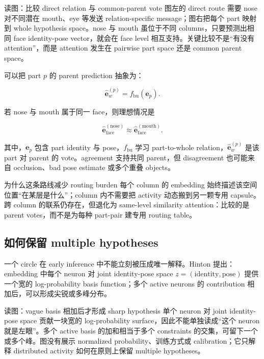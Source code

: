 \begin{knowledgebox}{读图：比较 direct relation 与 common-parent vote}
图左的 direct route 需要 nose 对不同潜在 mouth、eye 等发送 relation-specific message；图右把每个 part 映射到 whole hypothesis space。nose 与 mouth 虽位于不同 columns，只要预测出相同 face identity-pose vector，就会在 face level 相互支持。关键比较不是“有没有 attention”，而是 attention 发生在 pairwise part space 还是 common parent space。
\end{knowledgebox}

可以把 part $p$ 的 parent prediction 抽象为：

\[
\hat{\mathbf e}_{w}^{(p)}=f_{\mathrm{bu}}\!\left(\mathbf e_p\right).
\]

若 nose 与 mouth 属于同一 face，则理想情况是

\[
\hat{\mathbf e}_{\mathrm{face}}^{(\mathrm{nose})}
\approx
\hat{\mathbf e}_{\mathrm{face}}^{(\mathrm{mouth})}.
\]

其中，$\mathbf e_p$ 包含 part identity 与 pose，$f_{\mathrm{bu}}$ 学习 part-to-whole relation，$\hat{\mathbf e}_w^{(p)}$ 是该 part 对 parent 的 vote。agreement 支持共同 parent，但 disagreement 也可能来自 occlusion、bad pose estimate 或多个重叠 objects。

\begin{importantbox}{为什么这条路线减少 routing burden}
每个 column 的 embedding 始终描述该空间位置“在某层是什么”；column 内不需要把 activity 动态搬到另一颗专用 capsule。跨 column 的联系仍存在，但退化为 same-level similarity attention：比较的是 parent votes，而不是为每种 part-pair 建专用 routing table。
\end{importantbox}

\subsection{如何保留 multiple hypotheses}

一个 circle 在 early inference 中不能立刻被压成唯一解释。Hinton 提出：embedding 中每个 neuron 对 joint identity-pose space $z=(\text{identity},\text{pose})$ 提供一个宽的 log-probability basis function；多个 active neurons 的 contribution 相加后，可以形成尖锐或多峰分布。


\begin{knowledgebox}{读图：vague basis 相加后才形成 sharp hypothesis}
单个 neuron 对 joint identity-pose space 贡献一块宽的 log-probability surface，因此不能单独读成“这个 neuron 就是左眼”。多个 active basis 的加和相当于多个 constraints 的交集，可留下一个或多个峰。图没有展示 normalized probability、训练方式或 calibration；它只解释 distributed activity 如何在原则上保留 multiple hypotheses。
\end{knowledgebox}

